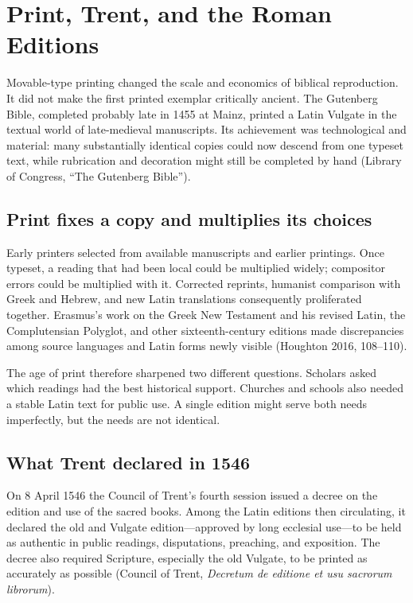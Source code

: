 \section{Print, Trent, and the Roman Editions}

Movable-type printing changed the scale and economics of biblical reproduction. It did not make the first printed exemplar critically ancient. The Gutenberg Bible, completed probably late in 1455 at Mainz, printed a Latin Vulgate in the textual world of late-medieval manuscripts. Its achievement was technological and material: many substantially identical copies could now descend from one typeset text, while rubrication and decoration might still be completed by hand (Library of Congress, ``The Gutenberg Bible'').

\subsection{Print fixes a copy and multiplies its choices}

Early printers selected from available manuscripts and earlier printings. Once typeset, a reading that had been local could be multiplied widely; compositor errors could be multiplied with it. Corrected reprints, humanist comparison with Greek and Hebrew, and new Latin translations consequently proliferated together. Erasmus's work on the Greek New Testament and his revised Latin, the Complutensian Polyglot, and other sixteenth-century editions made discrepancies among source languages and Latin forms newly visible (Houghton 2016, 108--110).

The age of print therefore sharpened two different questions. Scholars asked which readings had the best historical support. Churches and schools also needed a stable Latin text for public use. A single edition might serve both needs imperfectly, but the needs are not identical.

\subsection{What Trent declared in 1546}

On 8 April 1546 the Council of Trent's fourth session issued a decree on the edition and use of the sacred books. Among the Latin editions then circulating, it declared the old and Vulgate edition---approved by long ecclesial use---to be held as authentic in public readings, disputations, preaching, and exposition. The decree also required Scripture, especially the old Vulgate, to be printed as accurately as possible (Council of Trent, \emph{Decretum de editione et usu sacrorum librorum}).

